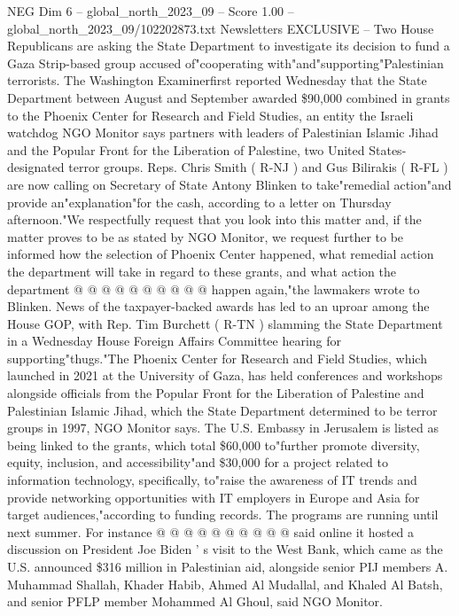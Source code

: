 \begin{textsample}{NEG Dim 6 – global\_north\_2023\_09 – Score 1.00 – global\_north\_2023\_09/102202873.txt}  \label{ex:f6_neg_336}
Newsletters EXCLUSIVE -- Two House Republicans are asking the State Department to investigate its decision to fund a Gaza Strip-based group accused of"cooperating with"and"supporting"Palestinian terrorists.
The Washington Examinerfirst reported Wednesday that the State Department between August and September awarded \$90,000 combined in grants to the Phoenix Center for Research and Field Studies, an entity the Israeli watchdog NGO Monitor says partners with leaders of Palestinian Islamic Jihad and the Popular Front for the Liberation of Palestine, two United States-designated terror groups.
Reps.
Chris Smith ( R-NJ ) and Gus Bilirakis ( R-FL ) are now calling on Secretary of State Antony Blinken to take"remedial action"and provide an"explanation"for the cash, according to a letter on Thursday afternoon."We respectfully request that you look into this matter and, if the matter proves to be as stated by NGO Monitor, we request further to be informed how the selection of Phoenix Center happened, what remedial action the department will take in regard to these grants, and what action the department @ @ @ @ @ @ @ @ @ @ happen again,"the lawmakers wrote to Blinken.
News of the taxpayer-backed awards has led to an uproar among the House GOP, with Rep.
Tim Burchett ( R-TN ) slamming the State Department in a Wednesday House Foreign Affairs Committee hearing for supporting"thugs."The Phoenix Center for Research and Field Studies, which launched in 2021 at the University of Gaza, has held conferences and workshops alongside officials from the Popular Front for the Liberation of Palestine and Palestinian Islamic Jihad, which the State Department determined to be terror groups in 1997, NGO Monitor says.
The U.S.
Embassy in Jerusalem is listed as being linked to the grants, which total \$60,000 to"further promote diversity, equity, inclusion, and accessibility"and \$30,000 for a project related to information technology, specifically, to"raise the awareness of IT trends and provide networking opportunities with IT employers in Europe and Asia for target audiences,"according to funding records.
The programs are running until next summer.
For instance @ @ @ @ @ @ @ @ @ @ said online it hosted a discussion on President Joe Biden ' s visit to the West Bank, which came as the U.S. announced \$316 million in Palestinian aid, alongside senior PIJ members A.
Muhammad Shallah, Khader Habib, Ahmed Al Mudallal, and Khaled Al Batsh, and senior PFLP member Mohammed Al Ghoul, said NGO Monitor.

\end{textsample}
